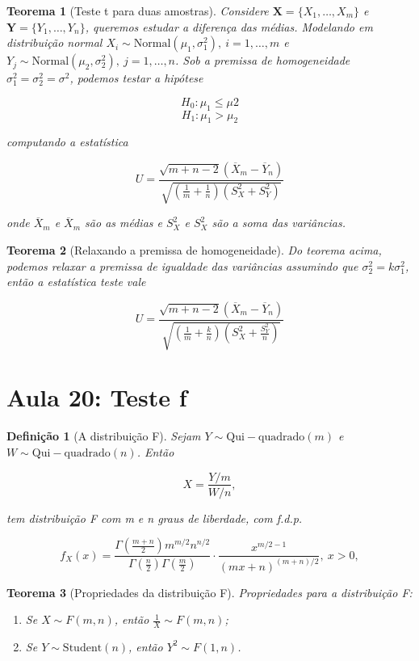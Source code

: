 \documentclass{article}
\newtheorem{theorem}{Teorema}
\newtheorem{definition}{Definição}
\begin{document}
	\begin{theorem}[Teste t para duas amostras]
		Considere $\textbf{X} = \{ X_1, \ldots, X_m \}$ e $\textbf{Y} = \{ Y_1, \ldots, Y_n \}$, queremos estudar a diferença das médias. Modelando em distribuição normal $X_i \sim \mathrm{Normal}(\mu_1, \sigma_1^2), \ i = 1, \ldots, m$ e $Y_j \sim \mathrm{Normal}(\mu_2, \sigma_2^2), \ j = 1, \ldots, n$. Sob a premissa de homogeneidade $\sigma_1^2 = \sigma_2^2 = \sigma^2$, podemos testar a hipótese
		
		$$H_0 : \mu_1 \leq \mu2$$
		$$H_1 : \mu_1 > \mu_2$$
		
		computando a estatística
		
		$$U = \frac{\sqrt{m + n - 2} (\overline{X}_m - \overline{Y}_n)}{\sqrt{(\frac{1}{m} + \frac{1}{n})(S_X^2 + S_Y^2)}}$$
		
		onde $\overline{X}_m$ e $\overline{X}_m$ são as médias e $S_X^2$ e $S_X^2$ são a soma das variâncias.
	\end{theorem}
	
	\begin{theorem}[Relaxando a premissa de homogeneidade]
		Do teorema acima, podemos relaxar a premissa de igualdade das variâncias assumindo que $\sigma_2^2 = k \sigma_1^2$, então a estatística teste vale
		
		$$U = \frac{\sqrt{m + n - 2} (\overline{X}_m - \overline{Y}_n)}{\sqrt{(\frac{1}{m} + \frac{k}{n})(S_X^2 + \frac{S_Y^2}{n})}}$$
	\end{theorem}
	
	\section*{Aula 20: Teste f}\label{s20}
	\begin{definition}[A distribuição F]
		Sejam $Y \sim \mathrm{Qui-quadrado}(m)$ e $W \sim \mathrm{Qui-quadrado}(n)$. Então
		
		$$X = \frac{Y / m}{W / n},$$
		
		tem distribuição F com m e n graus de liberdade, com f.d.p.
		
		$$f_X (x) = \frac{\Gamma(\frac{m + n}{2}) m^{m/2} n^{n/2}}{\Gamma(\frac{n}{2}) \Gamma(\frac{m}{2})} \cdot \frac{x^{m / 2 - 1}}{(mx + n)^{(m + n)/2}}, \ x > 0,$$
	\end{definition}
	
	\begin{theorem}[Propriedades da distribuição F] Propriedades para a distribuição F:
		
		\begin{enumerate}
			\item Se $X \sim F(m, n)$, então $\frac{1}{X} \sim F(m, n)$;
			
			\item Se $Y \sim \mathrm{Student}(n)$, então $Y^2 \sim F(1, n)$.
		\end{enumerate}
	\end{theorem}
	
\end{document}
